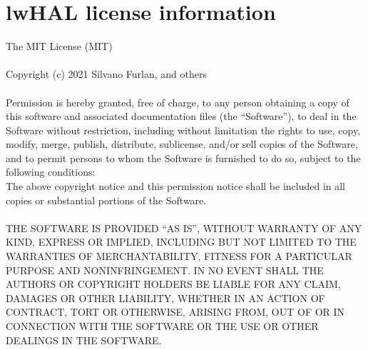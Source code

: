 \documentclass[letterpaper,10pt,english]{hitec}
\begin{document}
\newpage

\section{lwHAL license information}

The MIT License (MIT)
\\
\\
Copyright (c) 2021 Silvano Furlan, and others
\\
\\
Permission is hereby granted, free of charge, to any person obtaining a copy
of this software and associated documentation files (the “Software”), to deal
in the Software without restriction, including without limitation the rights
to use, copy, modify, merge, publish, distribute, sublicense, and/or sell
copies of the Software, and to permit persons to whom the Software is
furnished to do so, subject to the following conditions:
\\
The above copyright notice and this permission notice shall be included in
all copies or substantial portions of the Software.
\\
\\
THE SOFTWARE IS PROVIDED “AS IS”, WITHOUT WARRANTY OF ANY KIND, EXPRESS OR
IMPLIED, INCLUDING BUT NOT LIMITED TO THE WARRANTIES OF MERCHANTABILITY,
FITNESS FOR A PARTICULAR PURPOSE AND NONINFRINGEMENT. IN NO EVENT SHALL THE
AUTHORS OR COPYRIGHT HOLDERS BE LIABLE FOR ANY CLAIM, DAMAGES OR OTHER
LIABILITY, WHETHER IN AN ACTION OF CONTRACT, TORT OR OTHERWISE, ARISING FROM,
OUT OF OR IN CONNECTION WITH THE SOFTWARE OR THE USE OR OTHER DEALINGS IN
THE SOFTWARE.
\end{document}
